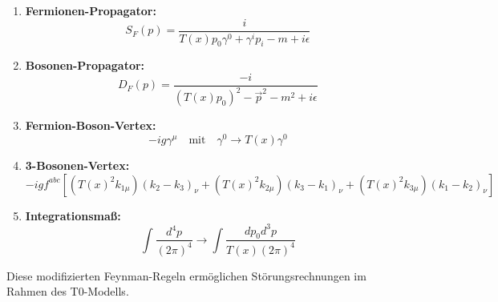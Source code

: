 \documentclass{article}
\theoremstyle{definition}
\theoremstyle{remark}
\newcommand{\Tfield}{T(x)} %
\begin{document}
	\begin{enumerate}
	\item \textbf{Fermionen-Propagator:}
	\begin{equation}
		S_F(p) = \frac{i}{\Tfield p_0 \gamma^0 + \gamma^i p_i - m + i\epsilon}
	\end{equation}
	
	\item \textbf{Bosonen-Propagator:}
	\begin{equation}
		D_F(p) = \frac{-i}{(\Tfield p_0)^2 - \vec{p}^2 - m^2 + i\epsilon}
	\end{equation}
	
	\item \textbf{Fermion-Boson-Vertex:}
	\begin{equation}
		-ig\gamma^\mu \quad \text{mit} \quad \gamma^0 \rightarrow \Tfield \gamma^0
	\end{equation}
	
	\item \textbf{3-Bosonen-Vertex:}
	\begin{equation}
		-ig f^{abc}[(\Tfield^2 k_{1\mu})(k_2 - k_3)_\nu + (\Tfield^2 k_{2\mu})(k_3 - k_1)_\nu + (\Tfield^2 k_{3\mu})(k_1 - k_2)_\nu]
	\end{equation}
	
	\item \textbf{Integrationsmaß:}
	\begin{equation}
		\int \frac{d^4p}{(2\pi)^4} \rightarrow \int \frac{dp_0 d^3p}{\Tfield (2\pi)^4}
	\end{equation}
	\end{enumerate}
	
	Diese modifizierten Feynman-Regeln ermöglichen Störungsrechnungen im Rahmen des T0-Modells.
	
\end{document}
